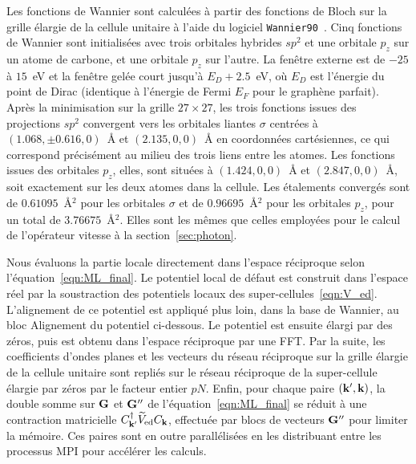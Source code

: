 Les fonctions de Wannier sont calculées à partir des fonctions de Bloch sur la grille élargie de la cellule unitaire à l'aide du logiciel \texttt{Wannier90}~\cite{mostofiWannier90ToolObtaining2008,mostofiUpdatedVersionWannier902014,pizziWannier90CommunityCode2020}. Cinq fonctions de Wannier sont initialisées avec trois orbitales hybrides $sp^2$ et une orbitale $p_z$ sur un atome de carbone, et une orbitale $p_z$ sur l'autre. La fenêtre externe est de $-25$ à $15$~eV et la fenêtre gelée court jusqu'à $E_D +2.5$~eV, où $E_D$ est l'énergie du point de Dirac (identique à l'énergie de Fermi $E_F$ pour le graphène parfait). Après la minimisation sur la grille $27\times 27$, les trois fonctions issues des projections $sp^2$ convergent vers les orbitales liantes $\sigma$ centrées à $(1.068, \pm0.616, 0)$~\AA{} et $(2.135, 0, 0)$~\AA{} en coordonnées cartésiennes, ce qui correspond précisément au milieu des trois liens entre les atomes. Les fonctions issues des orbitales $p_z$, elles, sont situées à $(1.424, 0, 0)$~\AA{} et $(2.847, 0, 0)$~\AA, soit exactement sur les deux atomes dans la cellule. Les étalements convergés sont de $0.61095$~\AA$^2$ pour les orbitales $\sigma$ et de $0.96695$~\AA$^2$ pour les orbitales $p_z$, pour un total de $3.76675$~\AA$^2$. Elles sont les mêmes que celles employées pour le calcul de l'opérateur vitesse à la section~\ref{sec:photon}.

\bigskip
{}

Nous évaluons la partie locale directement dans l'espace réciproque selon l'équation~\eqref{eqn:ML_final}. Le potentiel local de défaut est construit dans l'espace réel par la soustraction des potentiels locaux des super-cellules~\eqref{eqn:V_ed}. L'alignement de ce potentiel est appliqué plus loin, dans la base de Wannier, au bloc \og Alignement du potentiel \fg{} ci-dessous. Le potentiel est ensuite élargi par des zéros, puis est obtenu dans l'espace réciproque par une FFT. Par la suite, les coefficients d'ondes planes et les vecteurs du réseau réciproque sur la grille élargie de la cellule unitaire sont repliés sur le réseau réciproque de la super-cellule élargie par zéros par le facteur entier $pN$. Enfin, pour chaque paire $(\mathbf{k}',\mathbf{k})$, la double somme sur $\mathbf{G}$ et $\mathbf{G}''$ de l'équation~\eqref{eqn:ML_final} se réduit à une contraction matricielle $C^\dag_{\mathbf{k}'}\widetilde{V}_\text{ed}C_{\mathbf{k}}$, effectuée par blocs de vecteurs $\mathbf{G}''$ pour limiter la mémoire. Ces paires sont en outre parallélisées en les distribuant entre les processus MPI pour accélérer les calculs.

